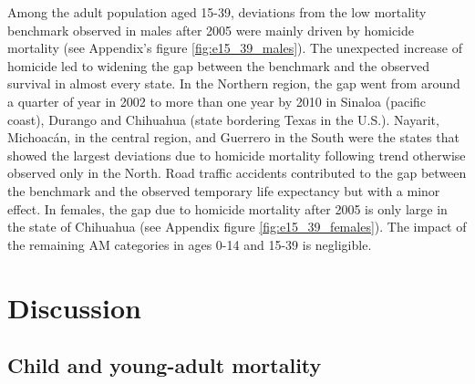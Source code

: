 \documentclass[11.5pt]{article}
\begin{document}
\begin{spacing}{1.5}
Among the adult population aged 15-39, deviations from the low mortality benchmark observed in males after 2005 were mainly driven by homicide mortality (see Appendix's figure \ref{fig:e15_39_males}). The unexpected increase of homicide led to widening the gap between the benchmark and the observed survival in almost every state. In the Northern region, the gap went from around a quarter of year in 2002 to more than one year by 2010 in Sinaloa (pacific coast), Durango and Chihuahua (state bordering Texas in the U.S.). Nayarit, Michoac\'an, in the central region, and Guerrero in the South were the states that showed the largest deviations due to homicide mortality following trend otherwise observed only in the North. Road traffic accidents contributed to the gap between the benchmark and the observed temporary life expectancy but with a minor effect. In females, the gap due to homicide mortality after 2005 is only large in the state of Chihuahua (see Appendix figure \ref{fig:e15_39_females}). The impact of the remaining  AM categories in ages 0-14 and 15-39 is negligible. 







\section*{Discussion}
\subsection*{Child and young-adult mortality}


\end{spacing}
\end{document}

